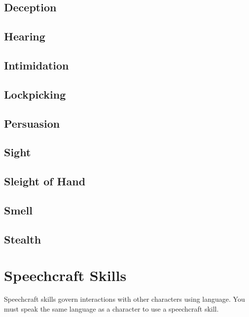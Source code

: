 \begin{multicols*}{2}
    \subsection{Deception}\label{skill:deception}

    \subsection{Hearing}\label{skill:hearing}

    \subsection{Intimidation}\label{skill:intimidation}

    \subsection{Lockpicking}\label{skill:lockpicking}

    \subsection{Persuasion}\label{skill:persuasion}

    \subsection{Sight}\label{skill:sight}

    \subsection{Sleight of Hand}\label{skill:sleight-of-hand}

    \subsection{Smell}\label{skill:smell}

    \subsection{Stealth}\label{skill:stealth}

    \section{Speechcraft Skills}\label{speechcraft-skills}
    Speechcraft skills govern interactions with other characters using language.
    You must speak the same language as a character to use a speechcraft skill.


\end{multicols*}
